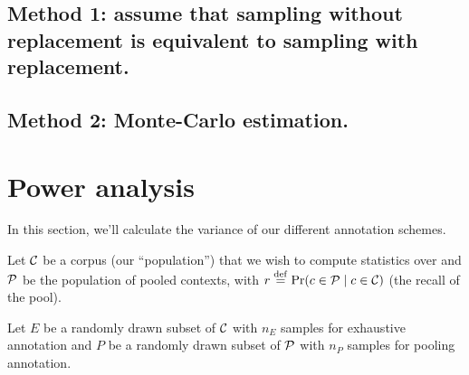 \subsection{Method 1: assume that sampling without replacement is equivalent to sampling with replacement.}

\subsection{Method 2: Monte-Carlo estimation.}



\section{Power analysis}
\label{sec:power}

In this section, we'll calculate the variance of our different annotation schemes.

\newcommand{\xh}{\hat{x}}
\newcommand{\xb}{\bar{x}}
\newcommand{\yh}{\hat{y}}
\newcommand{\yb}{\bar{y}}
\newcommand{\rh}{\hat{r}}
\newcommand{\ph}{\hat{p}}

Let $\mathcal{C}$ be a corpus (our ``population'') that we wish to compute statistics over
and $\mathcal{P}$ be the population of pooled contexts, 
  with $r \stackrel{\rm def}{=} \Pr(c \in \mathcal{P} \mid c \in \mathcal{C})$ (the recall of the pool).

Let $E$ be a randomly drawn subset of $\mathcal{C}$ with $n_E$ samples for exhaustive annotation and
    $P$ be a randomly drawn subset of $\mathcal{P}$ with $n_P$ samples for pooling annotation.

